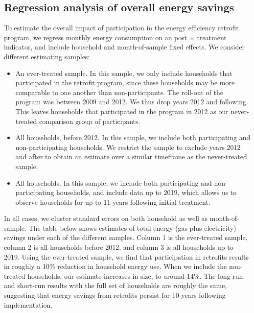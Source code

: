 \documentclass{article}
\begin{document}
\subsection{Regression analysis of overall energy savings}
To estimate the overall impact of participation in the energy efficiency retrofit program, we regress monthly energy consumption on an post $\times$ treatment indicator, and include household and month-of-sample fixed effects.  We consider different estimating samples:
\begin{itemize}
	\item An ever-treated sample. In this sample, we only include households that participated in the retrofit program, since these households may be more comparable to one another than non-participants. The roll-out of the program was between 2009 and 2012. We thus drop years 2012 and following. This leaves households that participated in the program in 2012 as our never-treated comparison group of participants.
	\item All households, before 2012. In this sample, we include both participating and non-participating households. We restrict the sample to exclude years 2012 and after to obtain an estimate over a similar timeframe as the never-treated sample.
	\item All households. In this sample, we include both participating and non-participating households, and include data up to 2019, which allows us to observe households for up to 11 years following initial treatment.
\end{itemize}
In all cases, we cluster standard errors on both household as well as month-of-sample.  The table below shows estimates of total energy (gas plus electricity) savings under each of the different samples.  Column 1 is the ever-treated sample, column 2 is all households before 2012, and column 3 is all households up to 2019.  Using the ever-treated sample, we find that participation in retrofits results in roughly a 10\% reduction in household energy use. When we include the non-treated households, our estimate increases in size, to around 14\%.  The long-run and short-run results with the full set of households are roughly the same, suggesting that energy savings from retrofits persist for 10 years following implementation.


\end{document}
